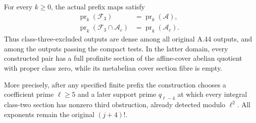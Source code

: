 \begin{theorem}
\label{thm:ghost-dense-class3}
For every \(k\ge0\), the actual prefix maps satisfy
\[
 \begin{split}
 \operatorname{pr}_k(\mathscr F_3)
       &=\operatorname{pr}_k(\mathscr A),\\
 \operatorname{pr}_k(\mathscr F_3\cap\mathscr A_c)
       &=\operatorname{pr}_k(\mathscr A_c).
 \end{split}                                         \tag{64}
\]
Thus class-three-excluded outputs are dense among
all original A.44 outputs, and among the outputs
passing the compact tests. In the latter domain,
every constructed pair has a full profinite section
of the affine-cover abelian quotient with proper
class zero, while its metabelian cover section
fibre is empty.

More precisely, after any specified finite prefix
the construction chooses a coefficient prime
\(\ell\ge5\) and a later support prime
\(q_{\ell-4}\) at which every integral class-two
section has nonzero third obstruction, already
detected modulo \(\ell^2\). All exponents remain
the original \((j+4)!\).
\end{theorem}
